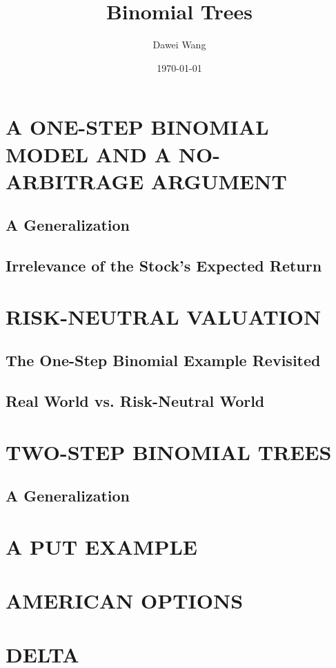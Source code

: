 \documentclass{article}
\title{Binomial Trees}
\author{Dawei Wang}
\date{\today}
\begin{document}
	\maketitle
\section{A ONE-STEP BINOMIAL MODEL AND A NO-ARBITRAGE ARGUMENT}

\subsection{A Generalization}

\subsection{Irrelevance of the Stock's Expected Return}


\section{RISK-NEUTRAL VALUATION}

\subsection{The One-Step Binomial Example Revisited}

\subsection{Real World vs. Risk-Neutral World}

\section{TWO-STEP BINOMIAL TREES}

\subsection{A Generalization}

\section{A PUT EXAMPLE}

\section{AMERICAN OPTIONS}

\section{DELTA}
\end{document}
